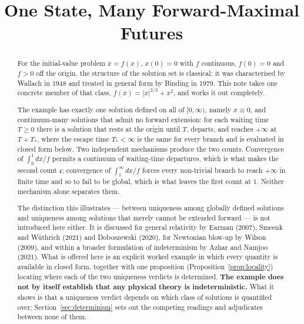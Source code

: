 \documentclass[12pt]{article}
\title{One State, Many Forward-Maximal Futures}
\author{}
\date{}
\theoremstyle{plain}
\theoremstyle{definition}
\theoremstyle{remark}
\newcommand{\cont}{\mathfrak{c}}
\begin{document}
\maketitle

\begin{abstract}
\noindent
For the initial-value problem $\dot x = f(x)$, $x(0)=0$ with $f$ continuous,
$f(0)=0$ and $f>0$ off the origin, the structure of the solution set is
classical: it was characterised by Wallach in 1948 and treated in general form
by Binding in 1979. This note takes one concrete
member of that class, $f(x)=|x|^{2/3}+x^{2}$, and works it out completely.

The example has exactly one solution defined on all of $[0,\infty)$, namely
$x\equiv 0$, and continuum-many solutions that admit no forward extension: for
each waiting time $T\ge 0$ there is a solution that rests at the origin until
$T$, departs, and reaches $+\infty$ at $T+T_{*}$, where the escape time
$T_{*}<\infty$ is the same for every branch and is evaluated in closed form
below. Two independent mechanisms produce the two counts. Convergence of
$\int_{0}^{1}dx/f$ permits a continuum of waiting-time departures, which is what
makes the second count $\cont$; convergence of $\int_{1}^{\infty}dx/f$ forces
every non-trivial branch to reach $+\infty$ in finite time and so to fail to be
global, which is what leaves the first count at $1$. Neither mechanism alone
separates them.

The distinction this illustrates --- between uniqueness among globally defined
solutions and uniqueness among solutions that merely cannot be extended
forward --- is not introduced here either. It is discussed for general relativity by Earman
(2007), Smeenk and W\"uthrich (2021) and Doboszewski (2020), for Newtonian
blow-up by Wilson (2009), and within a broader formulation of indeterminism by
Azhar and Namjoo (2021).
What is offered here is an explicit worked example in which every quantity is
available in closed form, together with one proposition
(Proposition~\ref{prop:locality}) locating where each of the two uniqueness
verdicts is determined. \textbf{The example does not by itself establish that
any physical theory is indeterministic.} What it shows is that a uniqueness
verdict depends on which class of solutions is quantified over;
Section~\ref{sec:determinism} sets out the competing readings and adjudicates
between none of them.
\end{abstract}

\end{document}
